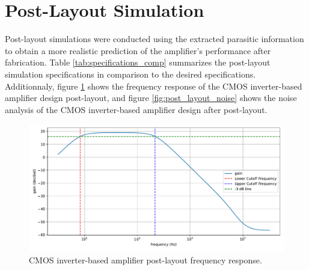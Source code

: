 \section{Post-Layout Simulation}
Post-layout simulations were conducted using the extracted parasitic information to obtain a more realistic prediction of the amplifier's performance after fabrication. 
Table \ref{tab:specifications_comp} summarizes the post-layout simulation specifications in comparison to the desired specifications.
\\
Additionnaly, figure \ref{fig:post_layout_frequency_response} shows the frequency response of the CMOS inverter-based amplifier design post-layout, 
and figure \ref{fig:post_layout_noise} shows the noise analysis of the CMOS inverter-based amplifier design after post-layout.

\begin{table}[ht!]
    \centering
    \caption{Specification Comparison}
    \label{tab:specifications_comp}
\end{table}

\begin{figure}[ht!]
    \centering
    \includegraphics[width=\textwidth]{Figures/post_layout_frequency_response.pdf}
    \caption{CMOS inverter-based amplifier post-layout frequency response.}
    \label{fig:post_layout_frequency_response}
\end{figure}

